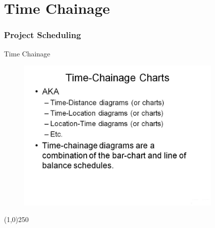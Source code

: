 \section{Time Chainage}


\begin{frame}
	\frametitle{Project Scheduling}
	\begin{block}{Time Chainage}
		
	\end{block}
\end{frame}








\begin{frame}
\begin{figure}
	\centering
		\includegraphics[width = 10.0cm]{oldnotes/Slide300.jpg}
\end{figure}
\end{frame}
\begin{center}\line(1,0){250}\end{center}




